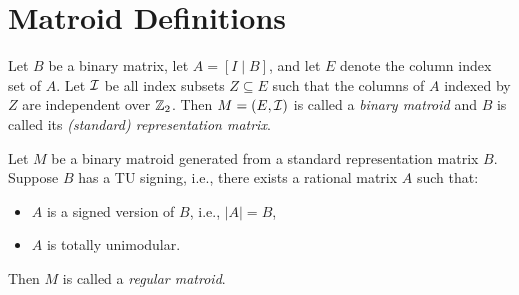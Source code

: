 \section{Matroid Definitions}

\begin{definition}
  \label{BinaryMatroid}
  \leanok
  Let $B$ be a binary matrix, let $A = \left[ I \mid B \right]$, and let $E$ denote the column index set of $A$.
  Let $\mathcal{I}$ be all index subsets $Z \subseteq E$ such that the columns of $A$ indexed by $Z$ are independent over $\mathbb{Z}_2$.
  Then $M = \left(E, \mathcal{I}\right)$ is called a \emph{binary matroid} and $B$ is called its \emph{(standard) representation matrix}.
\end{definition}

\begin{definition}
  \label{BinaryMatroid.IsRegular}
  \leanok
  Let $M$ be a binary matroid generated from a standard representation matrix $B$. Suppose $B$ has a TU signing, i.e., there exists a rational matrix $A$ such that:
  \begin{itemize}
    \item $A$ is a signed version of $B$, i.e., $\left| A \right| = B$,
    \item $A$ is totally unimodular.
  \end{itemize}
  Then $M$ is called a \emph{regular matroid}.
\end{definition}

\begin{lemma}
  \label{BinaryMatroid_toMatroid_isRegular_iff}
  \leanok %
\end{lemma}
